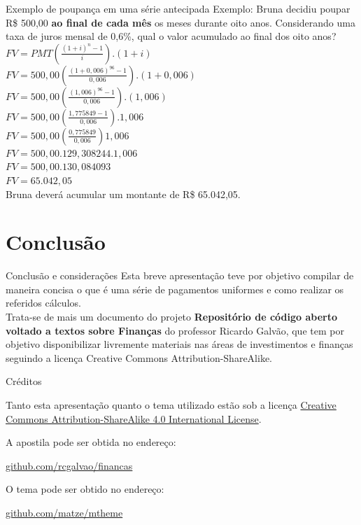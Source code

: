 \documentclass[10pt]{beamer}
\begin{document}
\begin{frame}{Exemplo de poupança em uma série antecipada}
\footnotesize  Exemplo: Bruna decidiu poupar R\$ 500,00 \textbf{ao final de cada mês} os meses durante oito anos. Considerando uma taxa de juros mensal de 0,6\%, qual o valor acumulado ao final dos oito anos?\\
$ FV = PMT \left( \frac{ ( 1 + i ) ^{n} - 1 }{ i } \right).(1 + i) $\\
$ FV = 500,00 \left( \frac{ ( 1 + 0,006 ) ^{96} - 1 }{ 0,006 } \right). (1 + 0,006) $\\
$ FV = 500,00 \left( \frac{ ( 1,006 ) ^{96} - 1 }{ 0,006 }\right).(1,006) $\\
$ FV = 500,00 \left( \frac{ 1,775849 - 1 }{ 0,006 } \right).1,006 $\\
$ FV = 500,00 \left( \frac{ 0,775849 }{ 0,006 }\right)1,006  $\\
$ FV = 500,00 . 129,308244.1,006 $\\
$ FV = 500,00 . 130,084093 $\\
$ FV = 65.042,05$\\
Bruna deverá acumular um montante de R\$ 65.042,05.
\end{frame}



\section{Conclusão}


\begin{frame}[fragile]{Conclusão e considerações}
Esta breve apresentação teve por objetivo compilar de maneira concisa o que é uma série de pagamentos uniformes e como realizar os referidos cálculos.\\
Trata-se de mais um documento do projeto \textbf{Repositório de código aberto voltado a textos sobre Finanças} do professor Ricardo Galvão, que tem por objetivo disponibilizar livremente materiais nas áreas de investimentos e finanças seguindo a licença Creative Commons Attribution-ShareAlike.


\end{frame}


\begin{frame}{Créditos}

Tanto esta apresentação quanto o tema utilizado estão sob a licença  \href{http://creativecommons.org/licenses/by-sa/4.0/}{Creative Commons
  Attribution-ShareAlike 4.0 International License}.
  \begin{center}\ccbysa\end{center}

A apostila pode ser obtida no endereço:
\begin{center}\url{github.com/rcgalvao/financas}\end{center}

O tema pode ser obtido no endereço: 
\begin{center}\url{github.com/matze/mtheme}\end{center}

\end{frame}
\end{document}
